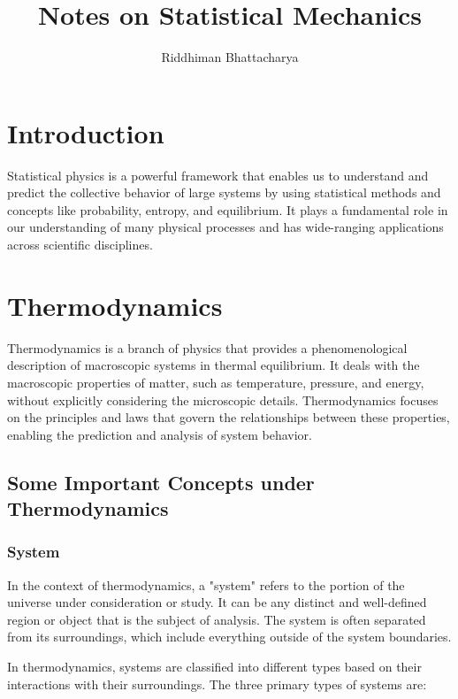 \documentclass{article}
\title{\Large \textbf{Notes on Statistical Mechanics}}
\author{Riddhiman Bhattacharya}
\begin{document}
\maketitle


\section{\Large Introduction}
\large
Statistical physics is a powerful framework that enables us to understand and predict the collective behavior of large systems by using statistical methods and concepts like probability, entropy, and equilibrium. It plays a fundamental role in our understanding of many physical processes and has wide-ranging applications across scientific disciplines.

\section{Thermodynamics}
Thermodynamics is a branch of physics that provides a phenomenological description of macroscopic systems in thermal equilibrium. It deals with the macroscopic properties of matter, such as temperature, pressure, and energy, without explicitly considering the microscopic details. Thermodynamics focuses on the principles and laws that govern the relationships between these properties, enabling the prediction and analysis of system behavior.

\subsection{\Large Some Important Concepts under Thermodynamics}
\subsubsection{\large System}
In the context of thermodynamics, a "system" refers to the portion of the universe under consideration or study. It can be any distinct and well-defined region or object that is the subject of analysis. The system is often separated from its surroundings, which include everything outside of the system boundaries.

In thermodynamics, systems are classified into different types based on their interactions with their surroundings. The three primary types of systems are:
\end{document}
